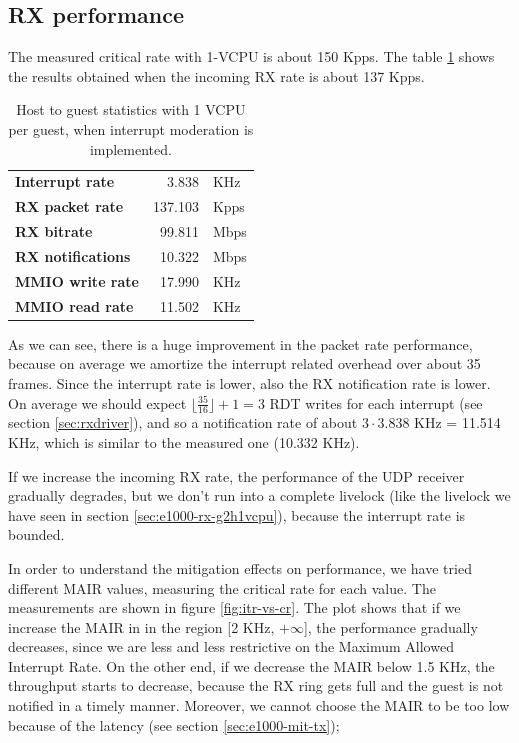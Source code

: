 \subsection{RX performance}
The measured critical rate with 1-VCPU is about 150 Kpps.
The table \ref{tab:e1000-mit-rx-g2h1vcpu} shows the results obtained when the incoming RX rate is about 137 Kpps.

\begin{table}
\begin{center}
\begin{tabular}{lrl}
\toprule
\textbf{Interrupt rate} & 3.838 & KHz\\
\textbf{RX packet rate} & 137.103 & Kpps\\
\textbf{RX bitrate} & 99.811 & Mbps\\
\textbf{RX notifications} & 10.322 & Mbps\\
\textbf{MMIO write rate} & 17.990 & KHz\\
\textbf{MMIO read rate} & 11.502 & KHz\\
\bottomrule
\end{tabular}
\end{center}
\caption{Host to guest statistics with 1 VCPU per guest, when interrupt moderation is implemented.}
\label{tab:e1000-mit-rx-g2h1vcpu}
\end{table}

As we can see, there is a huge improvement in the packet rate performance, because on average we amortize the interrupt related overhead
over about 35 frames. Since the interrupt rate is lower, also the RX notification rate is lower. On average we should expect 
$\lfloor \frac{35}{16} \rfloor + 1 = 3$ RDT writes for each interrupt (see section \ref{sec:rxdriver}), and so a notification rate of 
about $3 \cdot 3.838$ KHz = 11.514 KHz, which is similar to the measured one (10.332 KHz).

If we increase the incoming RX rate, the performance of the UDP receiver gradually degrades, but we don't run into a complete livelock 
(like the livelock we have seen in section \ref{sec:e1000-rx-g2h1vcpu}), because the interrupt rate is bounded.

\vspace{0.5cm}

In order to understand the mitigation effects on performance, we have tried different MAIR values, measuring the critical rate for
each value. The measurements are shown in figure \ref{fig:itr-vs-cr}.
The plot shows that if we increase the MAIR in in the region [2 KHz, $+\infty$], the performance gradually decreases, since we are 
less and less restrictive on the Maximum Allowed Interrupt Rate.
On the other end, if we decrease the MAIR below 1.5 KHz, the throughput starts to decrease, because the RX ring gets full and the guest
is not notified in a timely manner.
Moreover, we cannot choose the MAIR to be too low because of the latency (see section \ref{sec:e1000-mit-tx});

